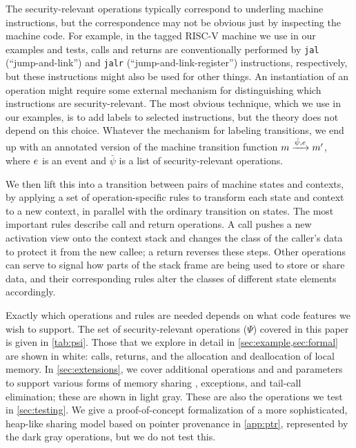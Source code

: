 \documentclass[10pt,conference]{ieeetran}%
\theoremstyle{definition}
\begin{document}
The security-relevant operations typically correspond to underling machine instructions,
but the correspondence may not be obvious just by inspecting the machine code.
For example, in the tagged RISC-V machine we use in our examples and tests,
calls and returns are conventionally performed by {\tt jal} (``jump-and-link'')
and {\tt jalr} (``jump-and-link-register'') instructions, respectively, but these
instructions might also be used for other things. An instantiation of an operation
might require some external mechanism for distinguishing which instructions are
security-relevant. The most obvious technique, which we use in our examples, is to add labels to
selected instructions, but the theory does not depend on this choice.
Whatever the mechanism for labeling transitions, we end up with an annotated version of the 
machine transition function \(m \xrightarrow{\bar{\psi}, e} m'\), where \(e\) is
an event and \(\bar{\psi}\) is a list of security-relevant operations.

We then lift this into a transition between pairs of machine states and contexts,
by applying a set of operation-specific rules to transform each state and context to
a new context, in parallel with the ordinary transition on states.
The most important rules describe call and return operations.
A call pushes a new activation view onto the context stack and changes the class of the
caller's data to protect it from the new callee; a return reverses these steps.
Other operations can serve to signal how parts of the stack frame are being used to store
or share data, and their corresponding rules alter the classes of different
state elements accordingly.

Exactly which operations and rules are needed depends on
what code features we wish to support. 
The set of security-relevant operations (\(\Psi\)) covered in this paper is given in
\cref{tab:psi}. Those that we explore in detail in \cref{sec:example,sec:formal}
are shown in white: calls, returns, and the allocation and deallocation of local memory.
In \cref{sec:extensions}, we cover additional operations and and parameters
to support various forms of memory sharing \ifexceptions , exceptions, \fi
and tail-call elimination; these are shown in light gray. These are also
the operations we test in \cref{sec:testing}.
We give a proof-of-concept formalization of a more sophisticated, heap-like sharing model
based on pointer provenance in \cref{app:ptr}, represented by the dark gray
operations, but we do not test this.
\end{document}
